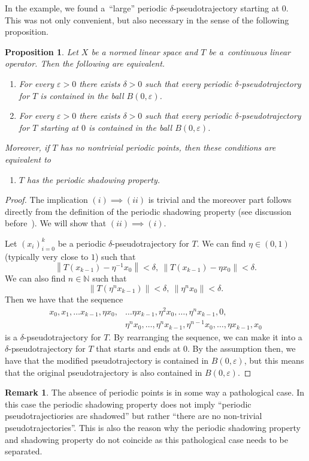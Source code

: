 \documentclass[11pt,a4paper]{amsart}
\newtheorem{proposition}[theorem]{Proposition}
\theoremstyle{definition}
\newtheorem{remark}[theorem]{Remark}
\newcommand{\N}{\mathbb{N}}
\newcommand{\norm}[1]{\left\| #1 \right\|}
\begin{document}
	In the example, we found a~``large'' periodic $\delta$-pseudotrajectory starting at $0$. This was not only convenient, but also necessary in the sense of the following proposition.
	\begin{proposition} \label{prop:PdPTstart}
		Let \(X\) be a normed linear space and \(T\) be a~continuous linear operator. Then the following are equivalent.
		\begin{enumerate}
			\item For every \(\varepsilon > 0\) there exists \(\delta > 0\) such that every periodic \(\delta\)-pseudotrajectory for \(T\) is contained in the ball \(B(0,\varepsilon)\).
			\item For every \(\varepsilon > 0\) there exists \(\delta > 0\) such that every periodic \(\delta\)-pseudotrajectory for \(T\) starting at \(0\) is contained in the ball \(B(0,\varepsilon)\).
		\end{enumerate}
		Moreover, if $T$ has no nontrivial periodic points, then these conditions are equivalent to
		\begin{enumerate}
			\item[(iii)] $T$ has the periodic shadowing property.
		\end{enumerate}
	\end{proposition}
	\begin{proof}
		The implication \((i) \implies (ii)\) is trivial and the moreover part follows directly from the definition of the periodic shadowing property (see discussion before~). We will show that $(ii) \implies (i)$.
		
		Let \((x_i)_{i=0}^{k}\) be a periodic \(\delta\)-pseudotrajectory for \(T\). We can find \(\eta \in (0,1)\) (typically very close to $1$) such that \[\norm{T(x_{k-1}) -\eta^{-1} x_0} < \delta, \ \norm{T(x_{k-1}) -\eta x_0} < \delta.\] We can also find \(n \in \N\) such that \[\norm{T(\eta^nx_{k-1})} < \delta, \ \norm{\eta^n x_0} < \delta.\]
		Then we have that the sequence
		\begin{align*}
			x_0, x_1, \dots x_{k-1}, \eta x_0, &\dots \eta x_{k-1}, \eta^2x_0, \dots,\eta^{n}x_{k-1},0, \\
			&\eta^{n}x_0, \dots, \eta^n x_{k-1}, \eta^{n-1}x_0, \dots, \eta x_{k-1}, x_0
		\end{align*}
		is a \(\delta\)-pseudotrajectory for \(T\). By rearranging the sequence, we can make it into a~\(\delta\)-pseudotrajectory for \(T\) that starts and ends at \(0\). By the assumption then, we have that the modified pseudotrajectory is contained in \(B(0,\varepsilon)\), but this means that the original pseudotrajectory is also contained in \(B(0,\varepsilon)\).
	\end{proof}
	\begin{remark}
		The absence of periodic points is in some way a pathological case. In this case the periodic shadowing property does not imply \enquote{periodic pseudotrajectiories are shadowed} but rather \enquote{there are no non-trivial pseudotrajectories}. This is also the reason why the periodic shadowing property and shadowing property do not coincide as this pathological case needs to be separated.
	\end{remark}
	
\end{document}
